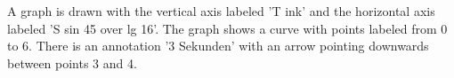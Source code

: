 A graph is drawn with the vertical axis labeled 'T ink' and the horizontal axis labeled 'S sin 45 over lg 16'. The graph shows a curve with points labeled from 0 to 6. There is an annotation '3 Sekunden' with an arrow pointing downwards between points 3 and 4.